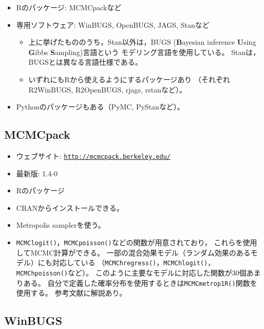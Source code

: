 \documentclass[11pt,uplatex]{jsarticle}
\begin{document}
\begin{itemize}
\item  \textsf{R}のパッケージ: MCMCpackなど
\item 専用ソフトウェア: \textsf{WinBUGS}, \textsf{OpenBUGS}, \textsf{JAGS}, \textsf{Stan}など
\begin{itemize}
 \item  上に挙げたもののうち，\textsf{Stan}以外は，BUGS (\textbf{B}ayesian inference \textbf{U}sing
 \textbf{G}ibbs \textbf{S}ampling)言語\cite{BUGSBook, BUGS}という
 モデリング言語を使用している。
 \label{BUGS}
\textsf{Stan}は，BUGSとは異なる言語仕様である。
\item  いずれにも\textsf{R}から使えるようにするパッケージあり
（それぞれ\textsf{R2WinBUGS}, \textsf{R2OpenBUGS}, \textsf{rjags}, \textsf{rstan}など）。
\end{itemize}
\item \textsf{Python}のパッケージもある（\textsf{PyMC}, \textsf{PyStan}など）。
\end{itemize}

\subsection{MCMCpack}

\begin{itemize}
\item ウェブサイト: \texttt{\url{http://mcmcpack.berkeley.edu/}}
\item 最新版: 1.4-0
\item \textsf{R}のパッケージ
\item CRANからインストールできる。
\item Metropolis samplerを使う。
\item \texttt{MCMClogit()}，\texttt{MCMCpoisson()}などの関数が用意されており，
これらを使用してMCMC計算ができる。
一部の混合効果モデル（ランダム効果のあるモデル）にも対応している
（\texttt{MCMChregress()}，\texttt{MCMChlogit()}，
\texttt{MCMChpoisson()}など）。
このように主要なモデルに対応した関数が30個あまりある。
自分で定義した確率分布を使用するときは\texttt{MCMCmetrop1R()}関数を使用する。
参考文献\cite{MCMCpack}に解説あり。
\end{itemize}

\subsection{WinBUGS}
\end{document}

